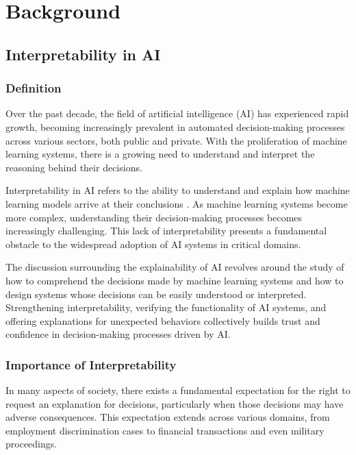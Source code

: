 

\chapter{Background} %
\label{Chapter2}
\lhead{} %

\section{Interpretability in AI}

\subsection{Definition}

Over the past decade, the field of artificial intelligence (AI) has experienced rapid growth, becoming increasingly prevalent in automated decision-making processes across various sectors, both public and private. With the proliferation of machine learning systems, there is a growing need to understand and interpret the reasoning behind their decisions.

Interpretability in AI refers to the ability to understand and explain how machine learning models arrive at their conclusions \cite{intepretai}. As machine learning systems become more complex, understanding their decision-making processes becomes increasingly challenging. This lack of interpretability presents a fundamental obstacle to the widespread adoption of AI systems in critical domains.

The discussion surrounding the explainability of AI revolves around the study of how to comprehend the decisions made by machine learning systems and how to design systems whose decisions can be easily understood or interpreted. Strengthening interpretability, verifying the functionality of AI systems, and offering explanations for unexpected behaviors collectively builds trust and confidence in decision-making processes driven by AI.

\subsection{Importance of Interpretability}

In many aspects of society, there exists a fundamental expectation for the right to request an explanation for decisions, particularly when those decisions may have adverse consequences. This expectation extends across various domains, from employment discrimination cases to financial transactions and even military proceedings.

